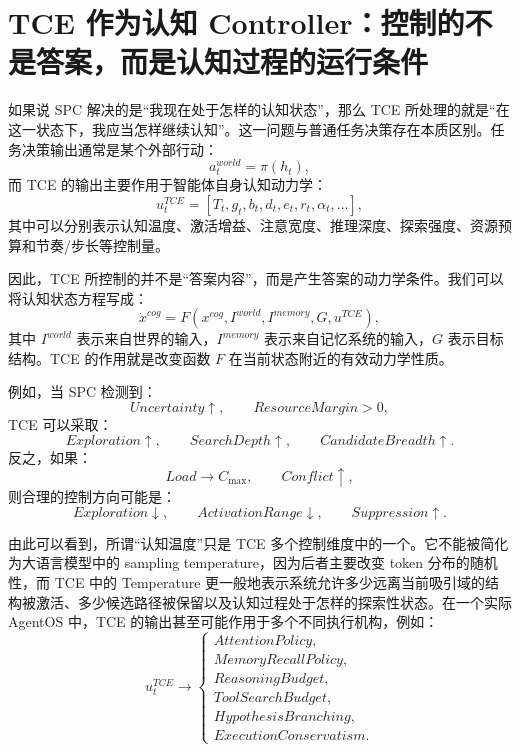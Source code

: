 \section{TCE 作为认知 Controller：控制的不是答案，而是认知过程的运行条件}

如果说 SPC 解决的是``我现在处于怎样的认知状态''，那么 TCE 所处理的就是``在这一状态下，我应当怎样继续认知''。这一问题与普通任务决策存在本质区别。任务决策输出通常是某个外部行动：
\begin{equation}
a_t^{world}
=
\pi
\left(
h_t
\right),
\end{equation}
而 TCE 的输出主要作用于智能体自身认知动力学：
\begin{equation}
u_t^{TCE}
=
[
T_t,
g_t,
b_t,
d_t,
e_t,
r_t,
\alpha_t,
\ldots
],
\label{eq:tce-vector}
\end{equation}
其中可以分别表示认知温度、激活增益、注意宽度、推理深度、探索强度、资源预算和节奏/步长等控制量。

因此，TCE 所控制的并不是``答案内容''，而是产生答案的动力学条件。我们可以将认知状态方程写成：
\begin{equation}
\dot{x}^{cog}
=
F
\left(
x^{cog},
I^{world},
I^{memory},
G,
u^{TCE}
\right),
\label{eq:cognitive-controlled-dynamics}
\end{equation}
其中 $I^{world}$ 表示来自世界的输入，$I^{memory}$ 表示来自记忆系统的输入，$G$ 表示目标结构。TCE 的作用就是改变函数 $F$ 在当前状态附近的有效动力学性质。

例如，当 SPC 检测到：
\begin{equation}
Uncertainty\uparrow,
\qquad
ResourceMargin>0,
\end{equation}
TCE 可以采取：
\begin{equation}
Exploration\uparrow,
\qquad
SearchDepth\uparrow,
\qquad
CandidateBreadth\uparrow.
\end{equation}
反之，如果：
\begin{equation}
Load\rightarrow C_{\max},
\qquad
Conflict\uparrow,
\end{equation}
则合理的控制方向可能是：
\begin{equation}
Exploration\downarrow,
\qquad
ActivationRange\downarrow,
\qquad
Suppression\uparrow.
\end{equation}

由此可以看到，所谓``认知温度''只是 TCE 多个控制维度中的一个。它不能被简化为大语言模型中的 sampling temperature，因为后者主要改变 token 分布的随机性，而 TCE 中的 Temperature 更一般地表示系统允许多少远离当前吸引域的结构被激活、多少候选路径被保留以及认知过程处于怎样的探索性状态。在一个实际 AgentOS 中，TCE 的输出甚至可能作用于多个不同执行机构，例如：
\begin{equation}
u_t^{TCE}
\rightarrow
\begin{cases}
AttentionPolicy,\\
MemoryRecallPolicy,\\
ReasoningBudget,\\
ToolSearchBudget,\\
HypothesisBranching,\\
ExecutionConservatism.
\end{cases}
\end{equation}

